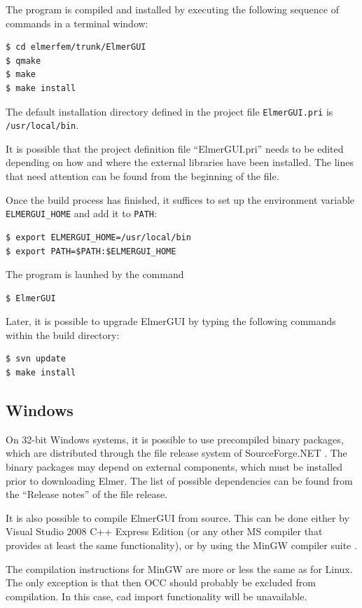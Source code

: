 \documentclass[a4paper,12pt]{article}
\begin{document}
The program is compiled and installed by executing the following sequence of commands in a terminal window:
\begin{verbatim}
$ cd elmerfem/trunk/ElmerGUI
$ qmake
$ make
$ make install
\end{verbatim}
The default installation directory defined in the project file {\tt ElmerGUI.pri} is
{\tt /usr/local/bin}.

It is possible that the project definition file ``ElmerGUI.pri'' needs to be edited depending on how and
where the external libraries have been installed. The lines that need attention can be found from
the beginning of the file.

Once the build process has finished, it suffices to set up the environment variable {\tt ELMERGUI\_HOME}
and add it to {\tt PATH}:
\begin{verbatim}
$ export ELMERGUI_HOME=/usr/local/bin
$ export PATH=$PATH:$ELMERGUI_HOME
\end{verbatim}
The program is launhed by the command
\begin{verbatim}
$ ElmerGUI
\end{verbatim}

Later, it is possible to upgrade ElmerGUI by typing the following commands within the build directory:
\begin{verbatim}
$ svn update
$ make install
\end{verbatim}

\subsection{Windows}

On 32-bit Windows systems, it is possible to use precompiled binary packages, which are distributed
through the file release system of SourceForge.NET \cite{ElmerfemHome}. The binary packages may depend
on external components, which must be installed prior to downloading Elmer. The list of possible
dependencies can be found from the ``Release notes'' of the file release.

It is also possible to compile ElmerGUI from source. This can be done either by
Visual Studio 2008 C++ Express Edition \cite{VCEE2008Home} (or any other MS
compiler that provides at least the same functionality), or by using the MinGW 
compiler suite \cite{MinGWHome}.

The compilation instructions for MinGW are more or less the same as for Linux. The only exception
is that then OCC should probably be excluded from compilation. In this case, cad import functionality will
be unavailable. 
\end{document}
